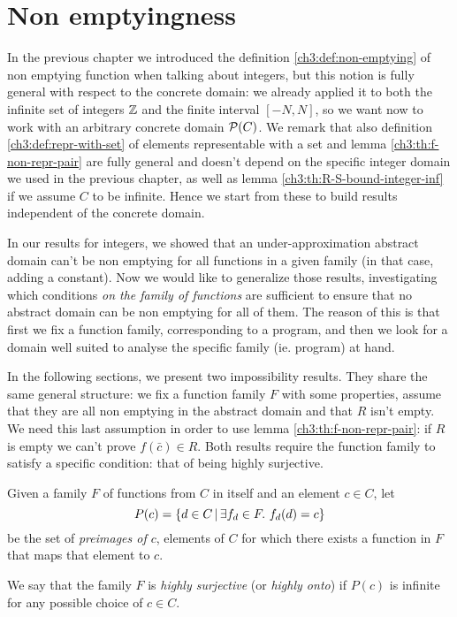 \section{Non emptyingness}
In the previous chapter we introduced the definition \ref{ch3:def:non-emptying} of non emptying function when talking about integers, but this notion is fully general with respect to the concrete domain: we already applied it to both the infinite set of integers $\mathbb{Z}$ and the finite interval $[-N, N]$, so we want now to work with an arbitrary concrete domain $\mathcal{P}(C)$.
We remark that also definition \ref{ch3:def:repr-with-set} of elements representable with a set and lemma \ref{ch3:th:f-non-repr-pair} are fully general and doesn't depend on the specific integer domain we used in the previous chapter, as well as lemma \ref{ch3:th:R-S-bound-integer-inf} if we assume $C$ to be infinite. Hence we start from these to build results independent of the concrete domain.

In our results for integers, we showed that an under-approximation abstract domain can't be non emptying for all functions in a given family (in that case, adding a constant). Now we would like to generalize those results, investigating which conditions \textit{on the family of functions} are sufficient to ensure that no abstract domain can be non emptying for all of them. The reason of this is that first we fix a function family, corresponding to a program, and then we look for a domain well suited to analyse the specific family (ie. program) at hand.

In the following sections, we present two impossibility results. They share the same general structure: we fix a function family $F$ with some properties, assume that they are all non emptying in the abstract domain and that $R$ isn't empty. We need this last assumption in order to use lemma \ref{ch3:th:f-non-repr-pair}: if $R$ is empty we can't prove $f(\bar{c}) \in R$.
Both results require the function family to satisfy a specific condition: that of being highly surjective.

\begin{definition}\label{ch4:def:highly-onto-func-family}
	Given a family $F$ of functions from $C$ in itself and an element $c \in C$, let
	\[
	P(c) = \{ d \in C \,\vert\, \exists f_d \in F .\ f_d(d) = c \}
	\]
	be the set of \textit{preimages of $c$}, elements of $C$ for which there exists a function in $F$ that maps that element to $c$.

	We say that the family $F$ is \textit{highly surjective} (or \textit{highly onto}) if $P(c)$ is infinite for any possible choice of $c \in C$.
\end{definition}

